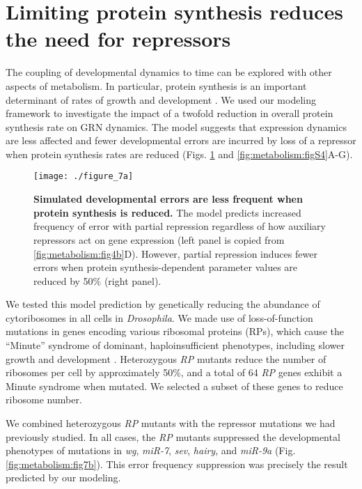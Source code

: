 \section{Limiting protein synthesis reduces the need for repressors}

The coupling of developmental dynamics to time can be explored with other aspects of metabolism. In particular, protein synthesis is an important determinant of rates of growth and development \cite{Lempiainen2009}. We used our modeling framework to investigate the impact of a twofold reduction in overall protein synthesis rate on GRN dynamics. The model suggests that expression dynamics are less affected and fewer developmental errors are incurred by loss of a repressor when protein synthesis rates are reduced (Figs. \ref{fig:metabolism:fig7a} and \ref{fig:metabolism:figS4}A-G).

\begin{figure}[h!]
\centering
\texttt{[image: ./figure\_7a]}
\caption[Simulated developmental errors are less frequent when protein synthesis is reduced.]{\textbf{Simulated developmental errors are less frequent when protein synthesis is reduced.} The model predicts increased frequency of error with partial repression regardless of how auxiliary repressors act on gene expression (left panel is copied from \ref{fig:metabolism:fig4b}D). However, partial repression induces fewer errors when protein synthesis-dependent parameter values are reduced by 50\% (right panel).}
\label{fig:metabolism:fig7a}
\end{figure}

We tested this model prediction by genetically reducing the abundance of cytoribosomes in all cells in \textit{Drosophila}. We made use of loss-of-function mutations in genes encoding various ribosomal proteins (RPs), which cause the ``Minute'' syndrome of dominant, haploinsufficient phenotypes, including slower growth and development \cite{Marygold2007,Sæbøelarssen1998}. Heterozygous \textit{RP} mutants reduce the number of ribosomes per cell by approximately 50\%, and a total of 64 \textit{RP} genes exhibit a Minute syndrome when mutated. We selected a subset of these genes to reduce ribosome number.

We combined heterozygous \textit{RP} mutants with the repressor mutations we had previously studied. In all cases, the \textit{RP} mutants suppressed the developmental phenotypes of mutations in \textit{wg}, \textit{miR-7}, \textit{sev}, \textit{hairy}, and \textit{miR-9a} (Fig. \ref{fig:metabolism:fig7b}). This error frequency suppression was precisely the result predicted by our modeling.

